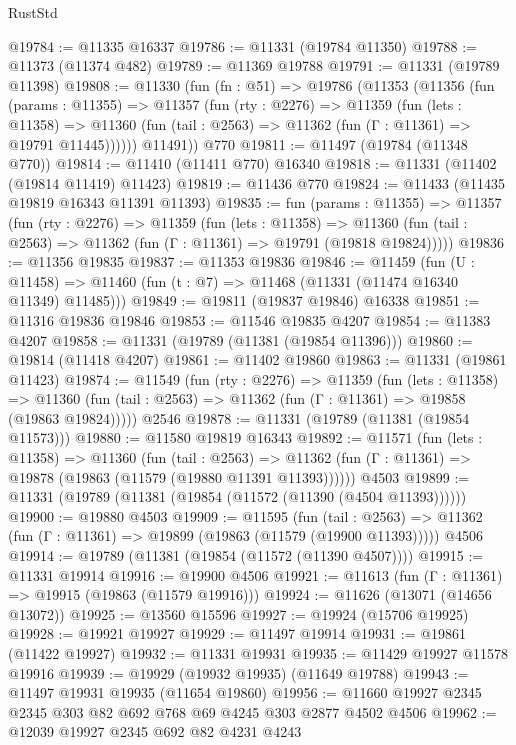 \begin{lexlean}{RustStd}
\begin{coremodule}
@19784 := @11335 @16337
@19786 := @11331 (@19784 @11350)
@19788 := @11373 (@11374 @482)
@19789 := @11369 @19788
@19791 := @11331 (@19789 @11398)
@19808 := @11330
    (fun (fn : @51) =>
    @19786
      (@11353
        (@11356
          (fun (params : @11355) =>
          @11357
            (fun (rty : @2276) =>
            @11359
              (fun (lets : @11358) =>
              @11360 (fun (tail : @2563) => @11362 (fun (Γ : @11361) => @19791 @11445))))))
        @11491))
    @770
@19811 := @11497 (@19784 (@11348 @770))
@19814 := @11410 (@11411 @770) @16340
@19818 := @11331 (@11402 (@19814 @11419) @11423)
@19819 := @11436 @770
@19824 := @11433 (@11435 @19819 @16343 @11391 @11393)
@19835 := fun (params : @11355) =>
  @11357
    (fun (rty : @2276) =>
    @11359
      (fun (lets : @11358) =>
      @11360 (fun (tail : @2563) => @11362 (fun (Γ : @11361) => @19791 (@19818 @19824)))))
@19836 := @11356 @19835
@19837 := @11353 @19836
@19846 := @11459
    (fun (U : @11458) => @11460 (fun (t : @7) => @11468 (@11331 (@11474 @16340 @11349) @11485)))
@19849 := @19811 (@19837 @19846) @16338
@19851 := @11316 @19836 @19846
@19853 := @11546 @19835 @4207
@19854 := @11383 @4207
@19858 := @11331 (@19789 (@11381 (@19854 @11396)))
@19860 := @19814 (@11418 @4207)
@19861 := @11402 @19860
@19863 := @11331 (@19861 @11423)
@19874 := @11549
    (fun (rty : @2276) =>
    @11359
      (fun (lets : @11358) =>
      @11360 (fun (tail : @2563) => @11362 (fun (Γ : @11361) => @19858 (@19863 @19824)))))
    @2546
@19878 := @11331 (@19789 (@11381 (@19854 @11573)))
@19880 := @11580 @19819 @16343
@19892 := @11571
    (fun (lets : @11358) =>
    @11360
      (fun (tail : @2563) =>
      @11362 (fun (Γ : @11361) => @19878 (@19863 (@11579 (@19880 @11391 @11393))))))
    @4503
@19899 := @11331 (@19789 (@11381 (@19854 (@11572 (@11390 (@4504 @11393))))))
@19900 := @19880 @4503
@19909 := @11595
    (fun (tail : @2563) => @11362 (fun (Γ : @11361) => @19899 (@19863 (@11579 (@19900 @11393)))))
    @4506
@19914 := @19789 (@11381 (@19854 (@11572 (@11390 @4507))))
@19915 := @11331 @19914
@19916 := @19900 @4506
@19921 := @11613 (fun (Γ : @11361) => @19915 (@19863 (@11579 @19916)))
@19924 := @11626 (@13071 (@14656 @13072))
@19925 := @13560 @15596
@19927 := @19924 (@15706 @19925)
@19928 := @19921 @19927
@19929 := @11497 @19914
@19931 := @19861 (@11422 @19927)
@19932 := @11331 @19931
@19935 := @11429 @19927 @11578 @19916
@19939 := @19929 (@19932 @19935) (@11649 @19788)
@19943 := @11497 @19931 @19935 (@11654 @19860)
@19956 := @11660 @19927 @2345 @2345 @303 @82 @692 @768 @69 @4245 @303 @2877 @4502 @4506
@19962 := @12039 @19927 @2345 @692 @82 @4231 @4243

\end{coremodule}
\end{lexlean}
